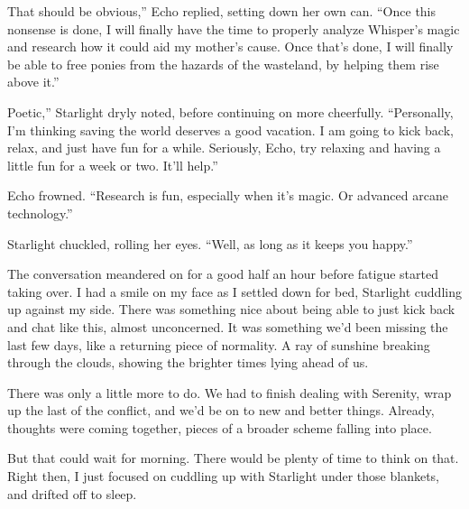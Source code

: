 \leavevmode{}That should be obvious,” Echo replied, setting down her own can. “Once this nonsense is done, I will finally have the time to properly analyze Whisper’s magic and research how it could aid my mother’s cause. Once that’s done, I will finally be able to free ponies from the hazards of the wasteland, by helping them rise above it.”

\leavevmode{}Poetic,” Starlight dryly noted, before continuing on more cheerfully. “Personally, I’m thinking saving the world deserves a good vacation. I am going to kick back, relax, and just have fun for a while. Seriously, Echo, try relaxing and having a little fun for a week or two. It’ll help.”

Echo frowned. “Research is fun, especially when it’s magic. Or advanced arcane technology.”

Starlight chuckled, rolling her eyes. “Well, as long as it keeps you happy.”

The conversation meandered on for a good half an hour before fatigue started taking over. I had a smile on my face as I settled down for bed, Starlight cuddling up against my side. There was something nice about being able to just kick back and chat like this, almost unconcerned. It was something we’d been missing the last few days, like a returning piece of normality. A ray of sunshine breaking through the clouds, showing the brighter times lying ahead of us.

There was only a little more to do. We had to finish dealing with Serenity, wrap up the last of the conflict, and we’d be on to new and better things. Already, thoughts were coming together, pieces of a broader scheme falling into place.

But that could wait for morning. There would be plenty of time to think on that. Right then, I just focused on cuddling up with Starlight under those blankets, and drifted off to sleep.